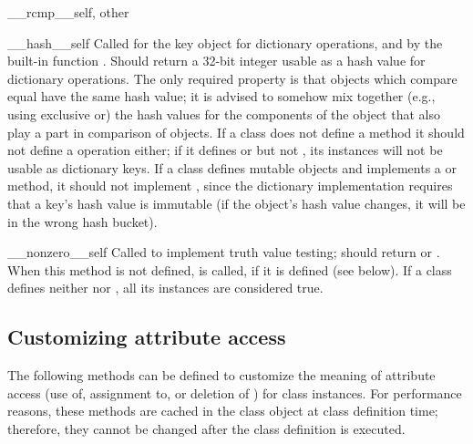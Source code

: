 \begin{methoddesc}[object]{__rcmp__}{self, other}
\end{methoddesc}

\begin{methoddesc}[object]{__hash__}{self}
Called for the key object for dictionary
operations, and by the built-in function
.  Should return a 32-bit integer
usable as a hash value
for dictionary operations.  The only required property is that objects
which compare equal have the same hash value; it is advised to somehow
mix together (e.g., using exclusive or) the hash values for the
components of the object that also play a part in comparison of
objects.  If a class does not define a  method it should
not define a  operation either; if it defines
 or  but not ,
its instances will not be usable as dictionary keys.  If a class
defines mutable objects and implements a  or
 method, it should not implement ,
since the dictionary implementation requires that a key's hash value
is immutable (if the object's hash value changes, it will be in the
wrong hash bucket).
\end{methoddesc}

\begin{methoddesc}[object]{__nonzero__}{self}
Called to implement truth value testing; should return  or
.  When this method is not defined,  is
called, if it is defined (see below).  If a class defines neither
 nor , all its instances are
considered true.
\end{methoddesc}


\subsection{Customizing attribute access\label{attribute-access}}

The following methods can be defined to customize the meaning of
attribute access (use of, assignment to, or deletion of )
for class instances.
For performance reasons, these methods are cached in the class object
at class definition time; therefore, they cannot be changed after the
class definition is executed.

